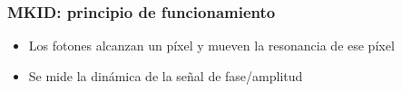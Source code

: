 \documentclass{beamer}
\begin{document}
\begin{frame}
\frametitle{MKID: principio de funcionamiento}
				\begin{center}
				\end{center}
																				\begin{itemize}
\item Los fotones alcanzan un píxel y mueven la resonancia de ese píxel
\item Se mide la
								dinámica de la
																				señal de fase/amplitud
				\end{itemize}
\end{frame} 
\end{document}
